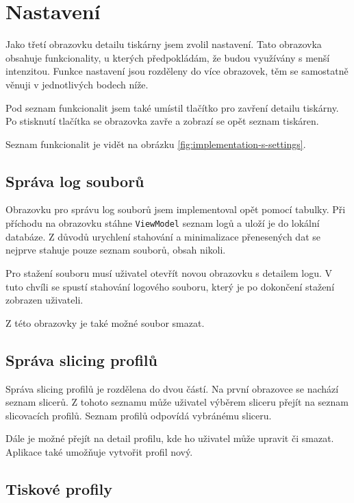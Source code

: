 \section{Nastavení}

Jako třetí obrazovku detailu tiskárny jsem zvolil nastavení.
Tato obrazovka obsahuje funkcionality, u kterých předpokládám, že budou využívány s menší intenzitou.
Funkce nastavení jsou rozděleny do více obrazovek, těm se samostatně věnuji v jednotlivých bodech níže.

Pod seznam funkcionalit jsem také umístil tlačítko pro zavření detailu tiskárny.
Po stisknutí tlačítka se obrazovka zavře a zobrazí se opět seznam tiskáren.

Seznam funkcionalit je vidět na obrázku \ref{fig:implementation-s-settings}.


\subsection{Správa log souborů}

Obrazovku pro správu log souborů jsem implementoval opět pomocí tabulky.
Při příchodu na obrazovku stáhne \texttt{ViewModel} seznam logů a uloží je do lokální databáze.
Z důvodů urychlení stahování a minimalizace přenesených dat se nejprve stahuje pouze seznam souborů, obsah nikoli.

Pro stažení souboru musí uživatel otevřít novou obrazovku s detailem logu.
V tuto chvíli se spustí stahování logového souboru, který je po dokončení stažení zobrazen uživateli.

Z této obrazovky je také možné soubor smazat.

\subsection{Správa slicing profilů}

Správa slicing profilů je rozdělena do dvou částí.
Na první obrazovce se nachází seznam slicerů.
Z tohoto seznamu může uživatel výběrem sliceru přejít na seznam slicovacích profilů.
Seznam profilů odpovídá vybránému sliceru.

Dále je možné přejít na detail profilu, kde ho uživatel může upravit či smazat.
Aplikace také umožňuje vytvořit profil nový.

\subsection{Tiskové profily}

